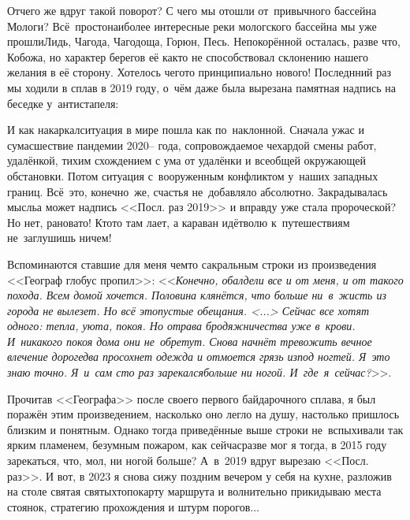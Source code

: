 {Отчего же вдруг такой поворот? С чего мы отошли от~привычного бассейна Мологи\cite{СоболевВепсскаяЛетопись}? Всё~просто\mdash наиболее интересные реки мологского бассейна мы уже прошли\mdash Лидь, Чагода, Чагодоща, Горюн, Песь. Непокорённой осталась, разве что, Кобожа, но характер берегов её как\sdash то не способствовал склонению нашего желания в её сторону. Хотелось чего\sdash то принципиально нового! Последнний раз мы ходили в сплав в 2019 году, о~чём даже была вырезана памятная надпись на беседке у~антистапеля: 

{\centering\LARGE{}}

\newpage
И как накаркал\mdash ситуация в мире пошла как по~наклонной. Сначала ужас и сумасшествие пандемии 2020\thinspace\nobreakdash-- года, сопровождаемое чехардой смены работ, удалёнкой, тихим схождением с ума от удалёнки и всеобщей окружающей обстановки. Потом ситуация с~вооруженным конфликтом у~наших западных границ. Всё~это, конечно~же, счастья не~добавляло абсолютно. Закрадывалась мысль\mdash а может надпись <<Посл. раз 2019>> и вправду уже стала пророческой? Но нет, рановато! Кто\sdash то там лает, а караван идёт\mdash волю к~путешествиям не~заглушишь ничем!

Вспоминаются ставшие для меня чем\sdash то сакральным строки из произведения <<Географ глобус пропил>>: <<\textit{Конечно, обалдели все и от меня, и от такого похода. Всем домой хочется. Половина клянётся, что больше ни~в~жисть из города не вылезет. Но всё это\mdash пустые обещания. <...> Сейчас все хотят одного: тепла, уюта, покоя. Но отрава бродяжничества уже в~крови. И~никакого покоя дома они не~обретут. Снова начнёт тревожить вечное влечение дорог\mdash едва просохнет одежда и отмоется грязь из\sdash под ногтей. Я~это знаю точно. Я~и~сам сто раз зарекался\mdash больше ни ногой. И~где~я~сейчас?}>>\cite{ГеографГлобусПропил}.

Прочитав <<Географа>> после своего первого байдарочного сплава, я был поражён этим произведением, насколько оно легло на душу, настолько пришлось близким и понятным. Однако тогда приведённые выше строки не~вспыхивали так ярким пламенем, безумным пожаром, как сейчас\mdash разве мог я тогда, в 2015 году зарекаться, что, мол, ни ногой больше? А~в~2019 вдруг вырезаю <<Посл. раз>>. И вот, в 2023 я снова сижу поздним вечером у себя на кухне, разложив на столе святая святых\mdash топокарту маршрута и волнительно прикидываю места стоянок, стратегию прохождения и штурм порогов$\ldots$ 

}
